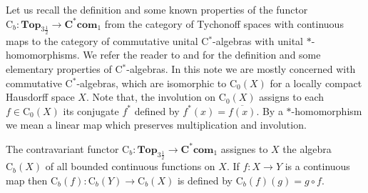 \documentclass[manuscript]{amsart}
\theoremstyle{definition}
\begin{document}
Let us recall the definition and some known properties of the functor
$\mathrm{C}_{b}: \mathbf{Top}_{3\frac{1}{2}}\to \mathbf{C^{*}com}_{1}$ from
the category of Tychonoff spaces with continuous maps  to
the category of commutative unital C$^{*}$-algebras with unital $*$-homomorphisms.
We refer the reader to \cite{mu90}  and \cite{ta79} for the definition and
some elementary properties of C$^{*}$-algebras.
In this note we are mostly concerned with  commutative C$^{*}$-algebras,
which are isomorphic to $\mathrm{C}_{0}(X)$
for a  locally compact Hausdorff space $X$.
Note that, the involution  on $\mathrm{C}_{0}(X)$ assigns to each $f\in \mathrm{C}_{0}(X)$
its conjugate $f^{*}$ defined by $f^{*}(x)=\overline{f(x)}$.
By a $*$-homomorphism  we mean a linear map which preserves multiplication and
involution.

The contravariant functor
$\mathrm{C}_{b}:\mathbf{Top}_{3\frac{1}{2}}\to \mathbf{C^{*}com}_{1}$ assignes to $X$ the algebra
$\mathrm{C}_{b}(X)$  of all bounded continuous functions on
$X$.
If $f:X\to Y$ is a continuous map then
$\mathrm{C}_{b}(f):\mathrm{C}_{b}(Y)\to \mathrm{C}_{b}(X)$
is defined by $\mathrm{C}_{b}(f)(g)=g\circ f$.
\end{document}
